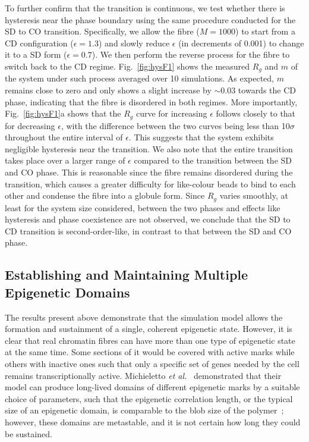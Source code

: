 \documentclass[12pt]{article}
\newcommand{\etal}{\emph{et al.}}
\begin{document}
To further confirm that the transition is continuous, we test whether there is hysteresis near the phase boundary using the same procedure conducted for the SD to CO transition. Specifically, we allow the fibre ($M = 1000$) to start from a CD configuration ($\epsilon = 1.3$) and slowly reduce $\epsilon$ (in decrements of 0.001) to change it to a SD form ($\epsilon = 0.7$). We then perform the reverse process for the fibre to switch back to the CD regime. Fig.~\ref{fig:hysF1} shows the measured $R_g$ and $m$ of the system under such process averaged over 10 simulations. As expected, $m$ remains close to zero and only shows a slight increase by $\sim 0.03$ towards the CD phase, indicating that the fibre is disordered in both regimes. More importantly, Fig.~\ref{fig:hysF1}a shows that the $R_g$ curve for increasing $\epsilon$ follows closely to that for decreasing $\epsilon$, with the difference between the two curves being less than 10$\sigma$ throughout the entire interval of $\epsilon$. This suggests that the system exhibits negligible hysteresis near the transition. We also note that the entire transition takes place over a larger range of $\epsilon$ compared to the transition between the SD and CO phase. This is reasonable since the fibre remains disordered during the transition, which causes a greater difficulty for like-colour beads to bind to each other and condense the fibre into a globule form. Since $R_g$ varies smoothly, at least for the system size considered, between the two phases and effects like hysteresis and phase coexistence are not observed, we conclude that the SD to CD transition is second-order-like, in contrast to that between the SD and CO phase. 

\FloatBarrier
\subsection{Establishing and Maintaining Multiple Epigenetic Domains}
The results present above demonstrate that the simulation model allows the formation and sustainment of a single, coherent epigenetic state. However, it is clear that real chromatin fibres can have more than one type of epigenetic state at the same time. Some sections of it would be covered with active marks while others with inactive ones such that only a specific set of genes needed by the cell remains transcriptionally active. Michieletto \etal ~\cite{michieletto2016} demonstrated that their model can produce long-lived domains of different epigenetic marks by a suitable choice of parameters, such that the epigenetic correlation length, or the typical size of an epigenetic domain, is comparable to the blob size of the polymer~\cite{gennes1985}; however, these domains are metastable, and it is not certain how long they could be sustained.
\end{document}
